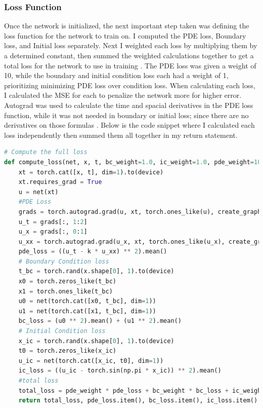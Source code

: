 \documentclass[12pt, reqno]{amsart}
\begin{document}
\subsubsection{Loss Function}
Once the network is initialized, the next important step taken was defining the loss function for the network to train on. I computed the PDE loss, Boundary loss, and Initial loss separately. Next I weighted each loss by multiplying them by a determined constant, then summed the weighted calculations together to get a total loss for the network to use in training \cite{5}. The PDE loss was given a weight of 10, while the boundary and initial condition loss each had a weight of 1, prioritizing minimizing PDE loss over condition loss. When calculating each loss, I calculated the MSE for each to penalize the network more for higher error. Autograd was used to calculate the time and spacial derivatives in the PDE loss function, while it was not needed in boundary or initial loss; since there are no derivatives on those formulas \cite{5}. Below is the code snippet where I calculated each loss independently then summed them all together in my return statement.
\begin{lstlisting}[language = Python, title = Loss Calculation Function]
# Compute the full loss
def compute_loss(net, x, t, bc_weight=1.0, ic_weight=1.0, pde_weight=10.0):
    xt = torch.cat([x, t], dim=1).to(device)
    xt.requires_grad = True
    u = net(xt)
    #PDE Loss
    grads = torch.autograd.grad(u, xt, torch.ones_like(u), create_graph=True)[0]
    u_t = grads[:, 1:2]
    u_x = grads[:, 0:1]
    u_xx = torch.autograd.grad(u_x, xt, torch.ones_like(u_x), create_graph=True)[0][:, 0:1]
    pde_loss = ((u_t - k * u_xx) ** 2).mean()
    # Boundary Condition loss
    t_bc = torch.rand(x.shape[0], 1).to(device)
    x0 = torch.zeros_like(t_bc)
    x1 = torch.ones_like(t_bc)
    u0 = net(torch.cat([x0, t_bc], dim=1))
    u1 = net(torch.cat([x1, t_bc], dim=1))
    bc_loss = (u0 ** 2).mean() + (u1 ** 2).mean()
    # Initial Condition loss
    x_ic = torch.rand(x.shape[0], 1).to(device)
    t0 = torch.zeros_like(x_ic)
    u_ic = net(torch.cat([x_ic, t0], dim=1))
    ic_loss = ((u_ic - torch.sin(np.pi * x_ic)) ** 2).mean()
    #total loss 
    total_loss = pde_weight * pde_loss + bc_weight * bc_loss + ic_weight * ic_loss
    return total_loss, pde_loss.item(), bc_loss.item(), ic_loss.item()
\end{lstlisting}
\end{document}
